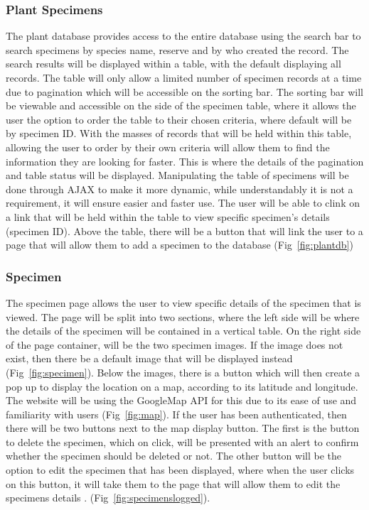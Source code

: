         \subsubsection{Plant Specimens}
           The plant database provides access to the entire database using the search bar to search specimens by species name, reserve and by who created the record. The search results will be displayed within a table, with the default displaying all records. The table will only allow a limited number of specimen records at a time due to pagination which will be accessible on the sorting bar. The sorting bar will be viewable and accessible on the side of the specimen table, where it allows the user the option to order the table to their chosen criteria, where default will be by specimen ID. With the masses of records that will be held within this table, allowing the user to order by their own criteria will allow them to find the information they are looking for faster. This is where the details of the pagination and table status will be displayed. Manipulating the table of specimens will be done through AJAX to make it more dynamic, while understandably it is not a requirement, it will ensure easier and faster use.
The user will be able to clink on a link that will be held within the table to view specific specimen’s details (specimen ID). Above the table, there will be a button that will link the user to a page that will allow them to add a specimen to the database (Fig~\ref{fig:plantdb})


        \subsubsection{Specimen}
     The specimen page allows the user to view specific details of the specimen that is viewed. The page will be split into two sections, where the left side will be where the details of the specimen will be contained in a vertical table. On the right side of the page container, will be the two specimen images. If the image does not exist, then there be a default image that will be displayed instead (Fig~\ref{fig:specimen}). Below the images, there is a button which will then create a pop up to display the location on a map, according to its latitude and longitude. The website will be using the GoogleMap API for this due to its ease of use and familiarity with users (Fig~\ref{fig:map}). If the user has been authenticated, then there will be two buttons next to the map display button. The first is the button to delete the specimen, which on click, will be presented with an alert to confirm whether the specimen should be deleted or not. The other button will be the option to edit the specimen that has been displayed, where when the user clicks on this button, it will take them to the page that will allow them to edit the specimens details . (Fig~\ref{fig:specimenslogged}). 

